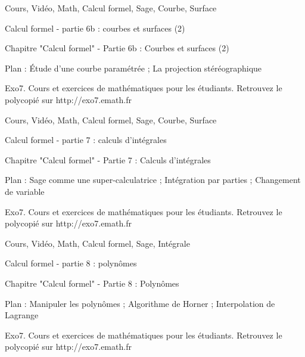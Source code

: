 
Cours, Vidéo, Math, Calcul formel, Sage, Courbe, Surface




Calcul formel - partie 6b : courbes et surfaces (2)



Chapitre "Calcul formel" - Partie 6b : Courbes et surfaces (2)

Plan : Étude d’une courbe paramétrée ; La projection stéréographique

Exo7. Cours et exercices de mathématiques pour les étudiants.
Retrouvez le polycopié sur http://exo7.emath.fr


Cours, Vidéo, Math, Calcul formel, Sage, Courbe, Surface





Calcul formel - partie 7 : calculs d’intégrales



Chapitre "Calcul formel" - Partie 7 : Calculs d’intégrales

Plan : Sage comme une super-calculatrice ; Intégration par parties ; 
Changement de variable

Exo7. Cours et exercices de mathématiques pour les étudiants.
Retrouvez le polycopié sur http://exo7.emath.fr


Cours, Vidéo, Math, Calcul formel, Sage, Intégrale





Calcul formel - partie 8 : polynômes



Chapitre "Calcul formel" - Partie 8 : Polynômes

Plan : Manipuler les polynômes ; Algorithme de Horner ; 
Interpolation de Lagrange

Exo7. Cours et exercices de mathématiques pour les étudiants.
Retrouvez le polycopié sur http://exo7.emath.fr


